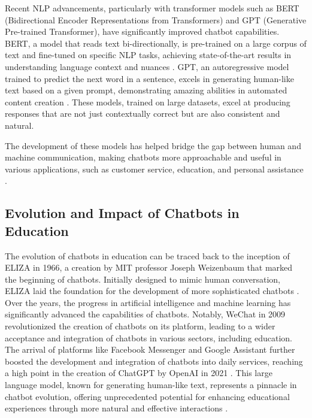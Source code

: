 \documentclass{l4proj}
\begin{document}
Recent NLP advancements, particularly with transformer models such as BERT (Bidirectional Encoder Representations from Transformers) and GPT (Generative Pre-trained Transformer), have significantly improved chatbot capabilities. BERT, a model that reads text bi-directionally, is pre-trained on a large corpus of text and fine-tuned on specific NLP tasks, achieving state-of-the-art results in understanding language context and nuances \citep{bert}. GPT, an autoregressive model trained to predict the next word in a sentence, excels in generating human-like text based on a given prompt, demonstrating amazing abilities in automated content creation \citep{gpt}. These models, trained on large datasets, excel at producing responses that are not just contextually correct but are also consistent and natural. 

The development of these models has helped bridge the gap between human and machine communication, making chatbots more approachable and useful in various applications, such as customer service, education, and personal assistance \citep{rane2022aidriven}.




\subsection{Evolution and Impact of Chatbots in Education}

The evolution of chatbots in education can be traced back to the inception of ELIZA in 1966, a creation by MIT professor Joseph Weizenbaum that marked the beginning of chatbots. Initially designed to mimic human conversation, ELIZA laid the foundation for the development of more sophisticated chatbots \citep{onlimHistoryChatbots}. Over the years, the progress in artificial intelligence and machine learning has significantly advanced the capabilities of chatbots. Notably, WeChat in 2009 revolutionized the creation of chatbots on its platform, leading to a wider acceptance and integration of chatbots in various sectors, including education. The arrival of platforms like Facebook Messenger and Google Assistant further boosted the development and integration of chatbots into daily services, reaching a high point in the creation of ChatGPT by OpenAI in 2021 \citep{onlimHistoryChatbots}. This large language model, known for generating human-like text, represents a pinnacle in chatbot evolution, offering unprecedented potential for enhancing educational experiences through more natural and effective interactions \citep{alamin2024history}.
\end{document}
